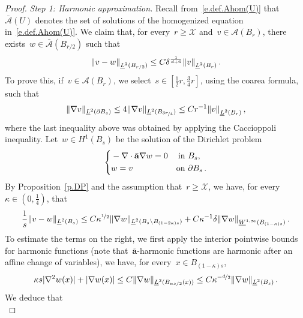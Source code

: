 \documentclass[11pt,twoside]{article} %
\numberwithin{equation}{section}
\theoremstyle{definition}
\let\originalleft\left
\let\originalright\right
\renewcommand{\left}{\mathopen{}\mathclose\bgroup\originalleft}
\renewcommand{\right}{\aftergroup\egroup\originalright}
\renewcommand{\a}{\mathbf{a}}
\newcommand{\ahom}{\bar{\a}}
\newcommand{\X}{\mathcal{X}}
\newcommand{\A}{\mathcal{A}}
\newcommand{\Ahom}{\bar{\A}}
\begin{document}
\begin{proof}
\emph{Step 1: Harmonic approximation.} 
Recall from~\eqref{e.def.Ahom(U)} that~$\Ahom(U)$ denotes the set of solutions of the homogenized equation in~\eqref{e.def.Ahom(U)}.
We claim that, for every~$r \geq \X$ and~$v \in \A(B_r)$, there exists~$w \in \Ahom (B_{r/2})$ such that 
\begin{equation}
\label{e.delta.harmonicapprox}
\left\| v - w \right\|_{\underline{L}^2(B_{r/2})}
\leq 
C\delta^{\frac{1}{d+6}} 
\left\| v \right\|_{\underline{L}^2(B_{r})}
\,.
\end{equation}
To prove this, if~$v\in \mathcal{A}(B_r)$, we select~$s\in [ \frac12 r, \frac34 r]$,  using the coarea formula, such that 
\begin{equation} \label{e.selectlayer}
\|  \nabla v \|_{\underline{L}^2(\partial B_s)}
\leq 
4 \|  \nabla v \|_{\underline{L}^2(B_{\nicefrac{3r}{4}})}
\leq 
Cr^{-1}\left\| v \right\|_{\underline{L}^2(B_{r})}
 \,,
\end{equation}
where the last inequality above was obtained by applying the Caccioppoli inequality. 
Let~$w \in H^1(B_s)$ be the solution of the Dirichlet problem
\begin{equation*}
\left\{
\begin{aligned}
& -\nabla \cdot \ahom \nabla w = 0 & \mbox{in} & \ B_{s}, \\
& w = v
& \mbox{on} & \ \partial B_{s}\,. \\
\end{aligned}
\right.
\end{equation*}
By Proposition~\ref{p.DP} and the assumption that~$r \geq \X$, we have, for every~$\kappa \in (0,\frac14)$,  that
\begin{equation}
\label{e.vtildekappa.to.w}
\frac1s
\| v - w \|_{\underline{L}^2(B_s)} 
\leq
C\kappa^{\nicefrac12} 
\| \nabla w \|_{\underline{L}^2 (B_{s} \setminus B_{(1-2\kappa)s})}
+
C \kappa^{-1} \delta 
\left\| \nabla w \right\|_{\underline{W}^{1,\infty}(B_{(1-\kappa)s})} \,.
\end{equation}
To estimate the terms on the right, we first apply the interior pointwise bounds for harmonic functions (note that~$\ahom$-harmonic functions are harmonic after an affine change of variables), we have, for every~$x \in B_{(1-\kappa)s}$,   
\begin{equation*}  
\kappa s | \nabla^2 w(x)| + | \nabla w(x)| 
\leq 
C  \| \nabla w \|_{\underline{L}^2(B_{\kappa s/2}(x))} 
\leq 
C \kappa^{-\nicefrac d2} \| \nabla w \|_{\underline{L}^2(B_s)}\,.
\end{equation*}
We deduce that 
\begin{equation*}

\end{equation*}
\end{proof}
\end{document}
